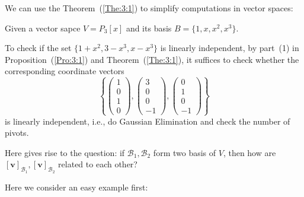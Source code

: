 We can use the Theorem~(\ref{The:3:1}) to simplify computations in vector spaces:
\begin{example}
Given a vector sapce $V=P_3[x]$ and its basis $B=\{1,x,x^2,x^3\}$.

To check if the set $\{1+x^2,3-x^3,x-x^3\}$ is linearly independent, by part~(1) in Proposition~(\ref{Pro:3:1}) and Theorem~(\ref{The:3:1}), it suffices to check whether the corresponding coordinate vectors
\[
\left\{
\begin{pmatrix}
1\\0\\1\\0
\end{pmatrix},
\begin{pmatrix}
3\\0\\0\\-1
\end{pmatrix},
\begin{pmatrix}
0\\1\\0\\-1
\end{pmatrix}
\right\}
\]
is linearly independent, i.e., do Gaussian Elimination and check the number of pivots.
\end{example}

Here gives rise to the question: if $\mathcal{B}_1,\mathcal{B}_2$ form two basis of $V$, then how are $[\bm v]_{\mathcal{B}_1},[\bm v]_{\mathcal{B}_2}$ related to each other?

Here we consider an easy example first:


